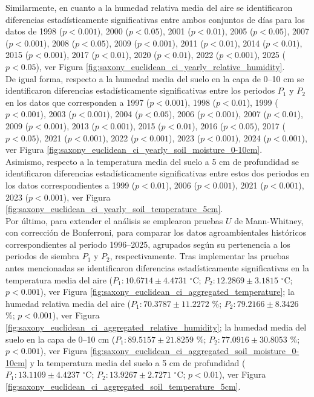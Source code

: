 Similarmente, en cuanto a la humedad relativa media del aire se identificaron diferencias estadísticamente significativas entre ambos conjuntos de días para los datos de 1998	($p<0.001$), 2000	($p<0.05$), 2001	($p<0.01$), 2005	($p<0.05$), 2007	($p<0.001$), 2008	($p<0.05$), 2009	($p<0.001$), 2011	($p<0.01$), 2014	($p<0.01$), 2015	($p<0.001$), 2017	($p<0.01$), 2020	($p<0.01$), 2022	($p<0.001$), 2025	($p<0.05$), ver Figura \ref{fig:saxony_euclidean_ci_yearly_relative_humidity}.\\


De igual forma, respecto a la humedad media del suelo en la capa de 0--10 cm se identificaron diferencias estadísticamente significativas entre los periodos $P_1$ y $P_2$ en los datos que corresponden a 1997	($p<0.001$), 1998	($p<0.01$), 1999	($p<0.001$), 2003	($p<0.001$), 2004	($p<0.05$), 2006	($p<0.001$), 2007	($p<0.01$), 2009	($p<0.001$), 2013	($p<0.001$), 2015	($p<0.01$), 2016	($p<0.05$), 2017	($p<0.05$), 2021	($p<0.001$), 2022	($p<0.001$), 2023	($p<0.001$), 2024	($p<0.001$), ver Figura \ref{fig:saxony_euclidean_ci_yearly_soil_moisture_0-10cm}.\\

Asimismo, respecto a la temperatura media del suelo a 5 cm de profundidad se identificaron diferencias estadísticamente significativas entre estos dos periodos en los datos correspondientes a  1999	($p<0.01$), 2006	($p<0.001$), 2021	($p<0.001$), 2023	($p<0.001$), ver Figura \ref{fig:saxony_euclidean_ci_yearly_soil_temperature_5cm}.\\

Por último, para extender el análisis se emplearon pruebas $U$ de Mann-Whitney, con corrección de Bonferroni, para comparar los datos agroambientales históricos correspondientes al periodo 1996--2025, agrupados según su pertenencia a los periodos de siembra $P_1$ y $P_2$, respectivamente.  Tras implementar las pruebas antes mencionadas se identificaron diferencias estadísticamente significativas en la temperatura media del aire ($P_1:	10.6714	\pm	4.4731	$ $^\circ$C; 	$P_2:	12.2869	\pm	3.1815	$ $^\circ$C; 	$p<0.001$), ver Figura \ref{fig:saxony_euclidean_ci_aggregated_temperature}; la humedad relativa media del aire ($P_1:	70.3787	\pm	11.2272	$ \%; 	$P_2:	79.2166	\pm	8.3426	$ \%; 	$p<0.001$), ver Figura \ref{fig:saxony_euclidean_ci_aggregated_relative_humidity}; la humedad media del suelo en la capa de 0--10 cm ($P_1:	89.5157	\pm	21.8259	$ \%; 	$P_2:	77.0916	\pm	30.8053	$ \%; 	$p<0.001$), ver Figura \ref{fig:saxony_euclidean_ci_aggregated_soil_moisture_0-10cm} y la temperatura media del suelo a 5 cm de profundidad ($P_1:	13.1109	\pm	4.4237	$ $^\circ$C; 	$P_2:	13.9267	\pm	2.7271	$ $^\circ$C; 	$p<0.01$), ver Figura \ref{fig:saxony_euclidean_ci_aggregated_soil_temperature_5cm}.\\

